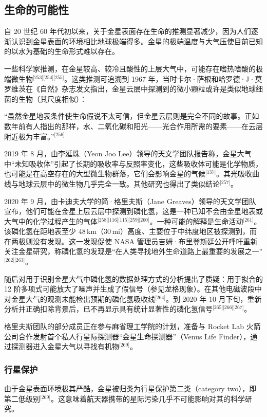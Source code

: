 \subsection{生命的可能性}
自 20 世纪 60 年代初以来，关于金星表面存在生命的推测显著减少，因为人们逐渐认识到金星表面的环境相比地球极端得多。金星的极端温度与大气压使目前已知的以水为基础的生命形式难以存在。

一些科学家推测，在金星较高、较冷且酸性的上层大气中，可能存在嗜热嗜酸的极端微生物\(^\text{[253][254][255]}\)。这类推测可追溯到 1967 年，当时卡尔·萨根和哈罗德·J·莫罗维茨在《自然》杂志发文指出，金星云层中探测到的微小颗粒或许是类似地球细菌的生物（其尺度相似）：

“虽然金星地表条件使生命假说不太可信，但金星云层则是完全不同的故事。正如数年前有人指出的那样，水、二氧化碳和阳光——光合作用所需的要素——在云层附近极为丰富。”\(^\text{[256]}\)

2019 年 8 月，由李延珠（Yeon Joo Lee）领导的天文学团队报告称，金星大气中“未知吸收体”引起了长期的吸收率与反照率变化，这些吸收体可能是化学物质，也可能是在高空存在的大型微生物群落，它们会影响金星的气候\(^\text{[137]}\)。其光吸收曲线与地球云层中的微生物几乎完全一致。其他研究也得出了类似结论\(^\text{[257]}\)。

2020 年 9 月，由卡迪夫大学的简·格里夫斯（Jane Greaves）领导的天文学团队宣布，他们可能在金星上层云层中探测到磷化氢，这是一种已知不会由金星地表或大气中的化学过程产生的气体\(^\text{[258][116][115][259][260]}\)。一种可能的解释是生命活动\(^\text{[261]}\)。该磷化氢在距地表至少 48\,km（30\,mi）高度、主要位于中纬度地区被探测到，而在两极则没有发现。这一发现促使 NASA 管理员吉姆·布里登斯廷公开呼吁重新关注金星研究，称磷化氢的发现是“在人类寻找地外生命道路上最重要的发展之一”\(^\text{[262][263]}\)。

随后对用于识别金星大气中磷化氢的数据处理方式的分析提出了质疑：用于拟合的 12 阶多项式可能放大了噪声并生成了假信号（参见龙格现象）。在其他电磁波段中对金星大气的观测未能检出预期的磷化氢吸收线\(^\text{[264]}\)。到 2020 年 10 月下旬，重新分析并正确扣除背景后，已不再显示具有统计显著性的磷化氢信号\(^\text{[265][266][267]}\)。

格里夫斯团队的部分成员正在参与麻省理工学院的计划，准备与 Rocket Lab 火箭公司合作发射首个私人行星际探测器“金星生命探测器”（Venus Life Finder），通过探测器进入金星大气以寻找有机物\(^\text{[269]}\)。
\subsubsection{行星保护}
由于金星表面环境极其严酷，金星被归类为行星保护第二类（category two），即第二低级别\(^\text{[269]}\)。这意味着航天器携带的星际污染几乎不可能影响对其的科学研究。

